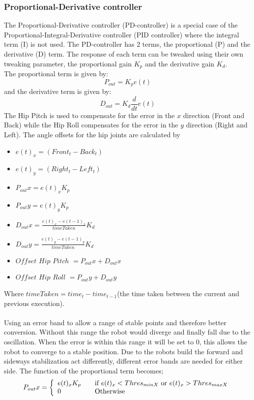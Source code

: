 \documentclass[a4paper]{article}
\begin{document}
\subsubsection{Proportional-Derivative controller}

The Proportional-Derivative controller (PD-controller) is a special case of the
Proportional-Integral-Derivative controller (PID controller) where the integral
term (I) is not used.  The PD-controller has 2 terms, the proportional (P) and
the derivative (D) term. The response of each term can be tweaked using their own tweaking parameter, the proportional gain $K_p$ and the derivative gain $K_d$. \\
The proportional term is given by:
\[
P_{out}  = K_pe(t)
 \]
and the derivative term is given by:
\[
D_{out}  = K_d\frac{d}{dt}e(t)
\]
The Hip Pitch is used to compensate for the error in the $x$ direction (Front
and Back) while the Hip Roll compensates for the error in the $y$ direction (Right and Left).
The angle offsets for the hip joints are calculated by
\begin{itemize}
    \item $e(t)_x = (Front_t - Back_t)$
    \item $e(t)_y = (Right_t - Left_t)$
    \item $P_{out} x = e(t)_xK_p$
    \item $P_{out} y = e(t)_yK_p$
    \item $D_{out} x = \frac{e(t)_x - e(t-1)_x}{timeTaken}K_d$
    \item $D_{out} y = \frac{e(t)_y - e(t-1)_y}{timeTaken}K_d$
    \item  $Offset$ $Hip$ $Pitch$ $= P_{out}x + D_{out}x$ 
    \item $Offset$ $Hip$ $Roll$ $=  P_{out}y + D_{out}y$ 
\end{itemize}
Where $timeTaken = time_t - time_{t-1}$(the time taken between the current and previous execution).\\\\
Using an error band to allow a range of stable points and therefore better
conversion. Without this range the robot would diverge and finally fall due to
the oscillation. When the error is within this range it will be set to 0, this
allows the robot to converge to a stable position. Due to the robots build the
forward and sideways stabilization act differently, different error bands are
needed for either side. The function of the proportional term becomes;
\[
  P_{out}x = \left\{ 
  \begin{array}{l l}
     e(t)_xK_p& \quad \text{if $e(t)_x < Thres_{min X}$ or $e(t)_x > Thres_{max X}$}\\ 
     0& \quad \text{Otherwise}\\
  \end{array} \right.
\]
\end{document}
